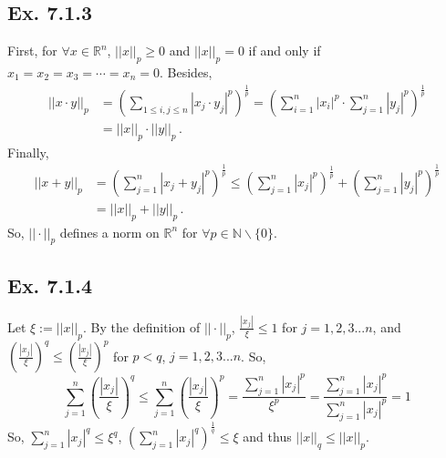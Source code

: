 \documentclass[11pt,twoside,a4paper]{article}
\begin{document}
\subsection{Ex. 7.1.3}
First, for $\forall x\in \mathbb{R}^n$, $||x||_p \geq 0$ and $||x||_p =0$ if and only if $x_1 = x_2 = x_3 = \cdots =x_n =0$.\newline
Besides,\begin{align*}
||x\cdot y||_p &=(\sum_{1\leq i,j\leq n} |x_j \cdot y_j |^p )^{\frac{1}{p}}=({\sum_{i=1}^{n} |x_i |^p}\cdot{\sum_{j=1}^{n} |y_j |^p})^{\frac{1}{p}}\\&=||x||_p \cdot ||y||_p\, .
\end{align*}
Finally,\begin{align*}
||x+y||_p &= (\sum_{j=1}^{n} |x_j + y_j|^p)^{\frac{1}{p}}\leq (\sum_{j=1}^{n} |x_j|^p)^{\frac{1}{p}}+(\sum_{j=1}^{n} |y_j|^p)^{\frac{1}{p}}\\&=||x||_p +||y||_p\, .
\end{align*}
So, $||\cdot||_p$ defines a norm on $\mathbb{R}^n$ for $\forall p\in\mathbb{N}\backslash\{0\}$.
\subsection{Ex. 7.1.4}
Let $\xi :=||x||_p$. By the definition of $||\cdot||_p$, $\frac{|x_j |}{\xi}\leq 1$ for $j=1,2,3...n$, and $(\frac{|x_j |}{\xi})^q\leq (\frac{|x_j |}{\xi})^p$ for $p<q$, $j=1,2,3...n$.\newline
So, $$\sum_{j=1}^{n} (\frac{|x_j |}{\xi})^q\leq\sum_{j=1}^{n} (\frac{|x_j |}{\xi})^p =\frac{\sum_{j=1}^{n} |x_j |^p}{\xi ^p}=\frac{\sum_{j=1}^{n} |x_j |^p}{\sum_{j=1}^{n} |x_j |^p}=1$$
So, $\sum_{j=1}^{n} |x_j |^q\leq\xi ^q$, $(\sum_{j=1}^{n} |x_j |^q)^{\frac{1}{q}}\leq\xi$ and thus $||x||_q \leq ||x||_p$.
\end{document}
